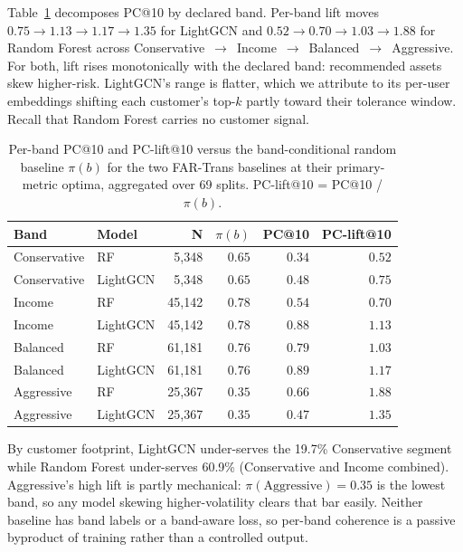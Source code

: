 Table~\ref{tab:per-band-rq3} decomposes PC@10 by declared band. Per-band lift moves $0.75 \to 1.13 \to 1.17 \to 1.35$ for LightGCN and $0.52 \to 0.70 \to 1.03 \to 1.88$ for Random Forest across Conservative~$\to$~Income~$\to$~Balanced~$\to$~Aggressive. For both, lift rises monotonically with the declared band: recommended assets skew higher-risk. LightGCN's range is flatter, which we attribute to its per-user embeddings shifting each customer's top-$k$ partly toward their tolerance window. Recall that Random Forest carries no customer signal.

\begin{table}[H]
\centering
\footnotesize
\setlength{\tabcolsep}{4pt}
\begin{tabular}{llrrrr}
\toprule
Band & Model & N & $\pi(b)$ & PC@10 & PC-lift@10 \\
\midrule
Conservative & RF       & 5{,}348  & $0.65$ & $0.34$ & $0.52$ \\
Conservative & LightGCN & 5{,}348  & $0.65$ & $0.48$ & $0.75$ \\
Income       & RF       & 45{,}142 & $0.78$ & $0.54$ & $0.70$ \\
Income       & LightGCN & 45{,}142 & $0.78$ & $0.88$ & $1.13$ \\
Balanced     & RF       & 61{,}181 & $0.76$ & $0.79$ & $1.03$ \\
Balanced     & LightGCN & 61{,}181 & $0.76$ & $0.89$ & $1.17$ \\
Aggressive   & RF       & 25{,}367 & $0.35$ & $0.66$ & $1.88$ \\
Aggressive   & LightGCN & 25{,}367 & $0.35$ & $0.47$ & $1.35$ \\
\bottomrule
\end{tabular}
\caption{Per-band PC@10 and PC-lift@10 versus the band-conditional random baseline $\pi(b)$ for the two FAR-Trans baselines at their primary-metric optima, aggregated over 69 splits. PC-lift@10 = PC@10 / $\pi(b)$.}
\label{tab:per-band-rq3}
\end{table}

By customer footprint, LightGCN under-serves the 19.7\% Conservative segment while Random Forest under-serves 60.9\% (Conservative and Income combined). Aggressive's high lift is partly mechanical: $\pi(\text{Aggressive}) = 0.35$ is the lowest band, so any model skewing higher-volatility clears that bar easily. Neither baseline has band labels or a band-aware loss, so per-band coherence is a passive byproduct of training rather than a controlled output.

